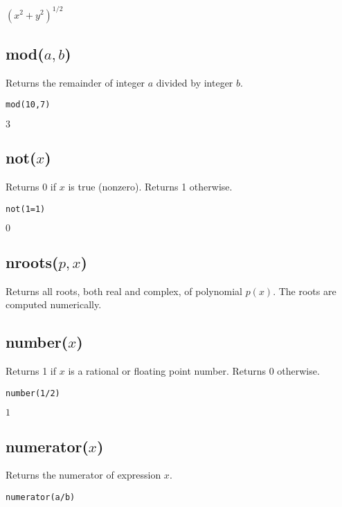 \noindent
$\displaystyle (x^2+y^2)^{1/2}$

\subsection*{mod($a,b$)}

Returns the remainder of integer $a$ divided by integer $b$.

{\color{blue}
\begin{verbatim}
mod(10,7)
\end{verbatim}
}

\noindent
$3$

\subsection*{not($x$)}

Returns 0 if $x$ is true (nonzero).
Returns 1 otherwise.

{\color{blue}
\begin{verbatim}
not(1=1)
\end{verbatim}
}

\noindent
$0$

\subsection*{nroots($p,x$)}

Returns all roots, both real and complex,
of polynomial $p(x)$.
The roots are computed numerically.

\subsection*{number($x$)}

Returns 1 if $x$ is a rational or floating point number.
Returns 0 otherwise.

{\color{blue}
\begin{verbatim}
number(1/2)
\end{verbatim}
}

\noindent
$1$

\subsection*{numerator($x$)}

Returns the numerator of expression $x$.

{\color{blue}
\begin{verbatim}
numerator(a/b)
\end{verbatim}
}

